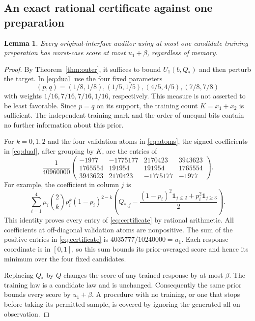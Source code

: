 \documentclass[11pt]{amsart}
\newtheorem{lemma}[theorem]{Lemma}
\theoremstyle{definition}\newtheorem{definition}[theorem]{Definition}
\theoremstyle{remark}\newtheorem{remark}[theorem]{Remark}
\newcommand{\1}{\mathbf 1}
\newcommand{\Qstar}{Q_*}
\begin{document}
\subsection{An exact rational certificate against one preparation}
\begin{lemma}\label{lem:one}
Every original-interface auditor using at most one candidate training
preparation has worst-case score at most $u_1+\beta$, regardless of memory.
\end{lemma}
\begin{proof}
By Theorem~\ref{thm:outer}, it suffices to bound $U_1(b,\Qstar)$ and
then perturb the target. In \eqref{eq:dual} use the four fixed parameters
\[
 (p,q)=(1/8,1/8),(1/5,1/5),(4/5,4/5),(7/8,7/8)
\]
with weights $1/16,7/16,7/16,1/16$, respectively. This measure is not
asserted to be least favorable. Since $p=q$ on its support, the training
count $K=x_1+x_2$ is sufficient. The independent training mark and the
order of unequal bits contain no further information about this prior.

For $k=0,1,2$ and the four validation atoms in \eqref{eq:atoms}, the signed
coefficients in \eqref{eq:dual}, after grouping by $K$, are the entries of
\begin{equation}\label{eq:certificate}
 \frac1{40960000}
 \begin{pmatrix}
 -1977&-1775177&2170423&3943623\\
 1765554&191954&191954&1765554\\
 3943623&2170423&-1775177&-1977
 \end{pmatrix}.
\end{equation}
For example, the coefficient in column $j$ is
\[
 \sum_{i=1}^4\mu_i {2\choose k}p_i^k(1-p_i)^{2-k}
       \left(Q_{*,j}-\frac{(1-p_i)^2\1_{j\le2}
                                     +p_i^2\1_{j\ge3}}2\right).
\]
This identity proves every entry of \eqref{eq:certificate} by rational
arithmetic. All coefficients at off-diagonal validation atoms are
nonpositive. The sum of the positive entries in \eqref{eq:certificate}
is $4035777/10240000=u_1$. Each response coordinate is in $[0,1]$, so
this sum bounds its prior-averaged score and hence its minimum over the
four fixed candidates.

Replacing $\Qstar$ by $Q$ changes the score of any trained response by
at most $\beta$. The training law is a candidate law and is unchanged.
Consequently the same prior bounds every score by $u_1+\beta$. A procedure
with no training, or one that stops before taking its permitted sample,
is covered by ignoring the generated all-on observation.
\end{proof}
\end{document}
